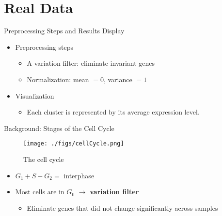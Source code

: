 


% 

\section{Real Data}

\begin{frame}
    \sectionpage
\end{frame}

\begin{frame}{Preprocessing Steps and Results Display}
    \begin{itemize}
        \item Preprocessing steps
            \begin{itemize}
                \item A variation filter: eliminate invariant genes
                \item  Normalization: mean $= 0$, variance $= 1$
            \end{itemize}
        \item Visualization
            \begin{itemize}
                \item Each cluster is represented by its average expression level.
            \end{itemize}
    \end{itemize}
\end{frame}

\begin{frame}{Background: Stages of the Cell Cycle}
    \begin{figure}
        \centering
        \texttt{[image: ./figs/cellCycle.png]}
        \caption{The cell cycle}
    \end{figure}
    \begin{itemize}
        \item $G_1 + S + G_2 =$ interphase
        \item Most cells are in $G_0$ $\rightarrow$ \textbf{variation filter}
              \begin{itemize}
                  \item Eliminate genes that did not change significantly across samples
              \end{itemize}
    \end{itemize}
\end{frame}

